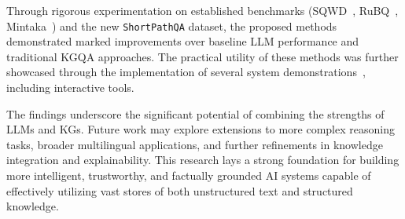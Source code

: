 Through rigorous experimentation on established benchmarks (SQWD~\cite{SQ_WD}, RuBQ~\cite{korablinov2020rubq}, Mintaka~\cite{DBLP:conf/coling/SenAS22-mintaka}) and the new \texttt{ShortPathQA} dataset, the proposed methods demonstrated marked improvements over baseline LLM performance and traditional KGQA approaches. The practical utility of these methods was further showcased through the implementation of several system demonstrations~\cite{DBLP:conf/acl/RazzhigaevSMBP23}, including interactive tools.

The findings underscore the significant potential of combining the strengths of LLMs and KGs. Future work may explore extensions to more complex reasoning tasks, broader multilingual applications, and further refinements in knowledge integration and explainability. This research lays a strong foundation for building more intelligent, trustworthy, and factually grounded AI systems capable of effectively utilizing vast stores of both unstructured text and structured knowledge.

